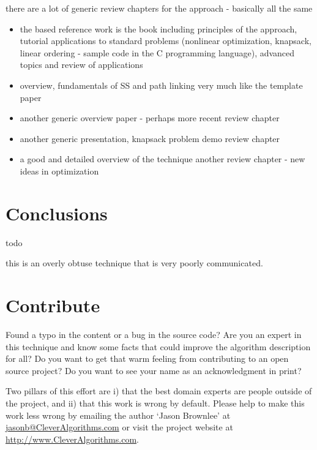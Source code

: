 \documentclass[a4paper, 11pt]{article}
\makeatletter
\newcommand{\myreportauthor}{Jason Brownlee}
\newcommand{\myreportemail}{jasonb@CleverAlgorithms.com}
\newcommand{\myreportwebsite}{http://www.CleverAlgorithms.com}
\makeatother
\begin{document}
there are a lot of generic review chapters for the approach - basically all the same

\begin{itemize}
	\item the based reference work is the book \cite{Laguna2003} including principles of the approach, tutorial applications to standard problems (nonlinear optimization, knapsack, linear ordering - sample code in the C programming language), advanced topics and review of applications
	\item overview, fundamentals of SS and path linking \cite{Glover2000} very much like the template paper
	\item another generic overview paper - perhaps more recent \cite{Martia2006} review chapter
	\item another generic presentation, knapsack problem demo \cite{Laguna2002} review chapter
	\item a good and detailed overview of the technique \cite{Glover1999} another review chapter - new ideas in optimization
\end{itemize}


% 
% 
\section{Conclusions}
\label{sec:conclusions}
todo

this is an overly obtuse technique that is very poorly communicated.


% 
% 
\section{Contribute}
\label{sec:contribute}
Found a typo in the content or a bug in the source code? 
Are you an expert in this technique and know some facts that could improve the algorithm description for all?
Do you want to get that warm feeling from contributing to an open source project? 
Do you want to see your name as an acknowledgment in print?

Two pillars of this effort are i) that the best domain experts are people outside of the project, and ii) that this work is wrong by default. 
Please help to make this work less wrong by emailing the author `\myreportauthor' at \url{\myreportemail} or visit the project website at \url{\myreportwebsite}.



\end{document}
